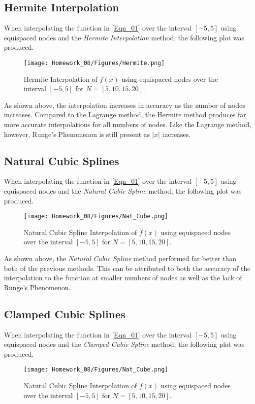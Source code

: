 \documentclass{article}
\begin{document}
\subsection{Hermite Interpolation}
When interpolating the function in \ref{Eqn_01} over the interval \([-5,5]\) using equispaced nodes and the \textit{Hermite Interpolation} method, the following plot was produced.
\begin{figure}[h!]
    \centering
    \texttt{[image: Homework\_08/Figures/Hermite.png]}
    \caption{Hermite Interpolation of \(f(x)\) using equispaced nodes over the interval \([-5,5]\) for \(N = [5,10,15,20]\).}
    \label{fig:Hermite}
\end{figure}
As shown above, the interpolation increases in accuracy as the number of nodes increases. Compared to the Lagrange method, the Hermite method produces far more accurate interpolations for all numbers of nodes. Like the Lagrange method, however, Runge's Phenomenon is still present as \(|x|\) increases.
\newpage

\subsection{Natural Cubic Splines}
When interpolating the function in \ref{Eqn_01} over the interval \([-5,5]\) using equispaced nodes and the \textit{Natural Cubic Spline} method, the following plot was produced.
\begin{figure}[h!]
    \centering
    \texttt{[image: Homework\_08/Figures/Nat\_Cube.png]}
    \caption{Natural Cubic Spline Interpolation of \(f(x)\) using equispaced nodes over the interval \([-5,5]\) for \(N = [5,10,15,20]\).}
    \label{fig:Nat_Cube}
\end{figure}

As shown above, the \textit{Natural Cubic Spline} method performed far better than both of the previous methods. This can be attributed to both the accuracy of the interpolation to the function at smaller numbers of nodes as well as the lack of Runge's Phenomenon.
\newpage

\subsection{Clamped Cubic Splines}
When interpolating the function in \ref{Eqn_01} over the interval \([-5,5]\) using equispaced nodes and the \textit{Clamped Cubic Spline} method, the following plot was produced.
\begin{figure}[h!]
    \centering
    \texttt{[image: Homework\_08/Figures/Nat\_Cube.png]}
    \caption{Natural Cubic Spline Interpolation of \(f(x)\) using equispaced nodes over the interval \([-5,5]\) for \(N = [5,10,15,20]\).}
    \label{fig:Clamp_Cube}
\end{figure}
\end{document}

